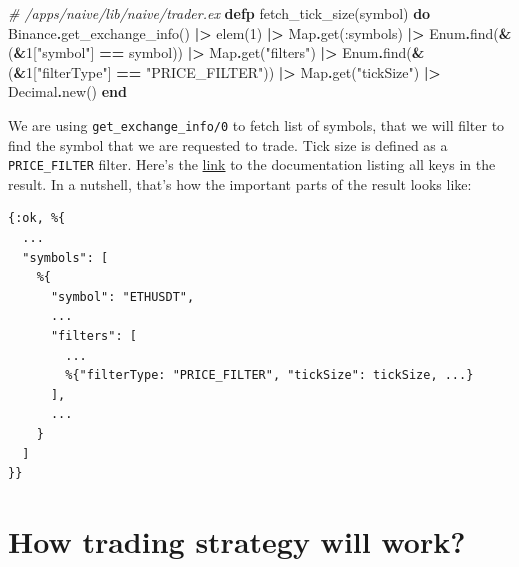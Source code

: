 \documentclass[
  oneside]{book}
\newenvironment{Shaded}{\begin{snugshade}}{\end{snugshade}}
\newcommand{\CommentTok}[1]{\textcolor[rgb]{0.56,0.35,0.01}{\textit{#1}}}
\newcommand{\ConstantTok}[1]{\textcolor[rgb]{0.00,0.00,0.00}{#1}}
\newcommand{\DecValTok}[1]{\textcolor[rgb]{0.00,0.00,0.81}{#1}}
\newcommand{\KeywordTok}[1]{\textcolor[rgb]{0.13,0.29,0.53}{\textbf{#1}}}
\newcommand{\NormalTok}[1]{#1}
\newcommand{\OperatorTok}[1]{\textcolor[rgb]{0.81,0.36,0.00}{\textbf{#1}}}
\newcommand{\StringTok}[1]{\textcolor[rgb]{0.31,0.60,0.02}{#1}}
\newcommand{\VariableTok}[1]{\textcolor[rgb]{0.00,0.00,0.00}{#1}}
\begin{document}
\begin{Shaded}
\begin{Highlighting}[]
  \CommentTok{\# /apps/naive/lib/naive/trader.ex}
  \KeywordTok{defp}\NormalTok{ fetch\_tick\_size(symbol) }\KeywordTok{do}
    \ConstantTok{Binance}\OperatorTok{.}\NormalTok{get\_exchange\_info()}
    \OperatorTok{|\textgreater{}}\NormalTok{ elem(}\DecValTok{1}\NormalTok{)}
    \OperatorTok{|\textgreater{}} \ConstantTok{Map}\OperatorTok{.}\NormalTok{get(}\VariableTok{:symbols}\NormalTok{)}
    \OperatorTok{|\textgreater{}} \ConstantTok{Enum}\OperatorTok{.}\NormalTok{find(}\OperatorTok{\&}\NormalTok{(}\OperatorTok{\&}\DecValTok{1}\NormalTok{[}\StringTok{"symbol"}\NormalTok{] }\OperatorTok{==}\NormalTok{ symbol))}
    \OperatorTok{|\textgreater{}} \ConstantTok{Map}\OperatorTok{.}\NormalTok{get(}\StringTok{"filters"}\NormalTok{)}
    \OperatorTok{|\textgreater{}} \ConstantTok{Enum}\OperatorTok{.}\NormalTok{find(}\OperatorTok{\&}\NormalTok{(}\OperatorTok{\&}\DecValTok{1}\NormalTok{[}\StringTok{"filterType"}\NormalTok{] }\OperatorTok{==} \StringTok{"PRICE\_FILTER"}\NormalTok{))}
    \OperatorTok{|\textgreater{}} \ConstantTok{Map}\OperatorTok{.}\NormalTok{get(}\StringTok{"tickSize"}\NormalTok{)}
    \OperatorTok{|\textgreater{}} \ConstantTok{Decimal}\OperatorTok{.}\NormalTok{new()}
  \KeywordTok{end}
\end{Highlighting}
\end{Shaded}

We are using \texttt{get\_exchange\_info/0} to fetch list of symbols, that we will filter to find the symbol that we are requested to trade. Tick size is defined as a \texttt{PRICE\_FILTER} filter. Here's the \href{https://github.com/binance/binance-spot-api-docs/blob/master/rest-api.md\#exchange-information}{link} to the documentation listing all keys in the result. In a nutshell, that's how the important parts of the result looks like:

\begin{verbatim}
{:ok, %{
  ...
  "symbols": [
    %{
      "symbol": "ETHUSDT",
      ...
      "filters": [
        ...
        %{"filterType: "PRICE_FILTER", "tickSize": tickSize, ...}
      ],
      ...
    }
  ]
}}
\end{verbatim}

\hypertarget{how-trading-strategy-will-work}{%
\section{How trading strategy will work?}\label{how-trading-strategy-will-work}}
\end{document}
